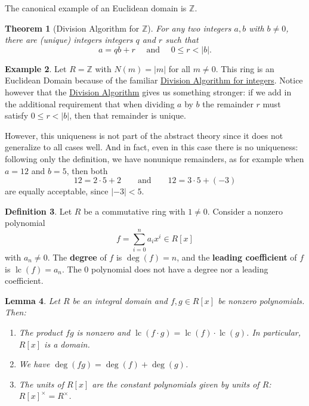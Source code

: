 \documentclass[12pt]{report}
\newtheorem{theorem}{Theorem}[chapter]
\newtheorem{lemma}[theorem]{Lemma}
\numberwithin{equation}{section}
\numberwithin{theorem}{chapter}
\theoremstyle{definition}
\newtheorem{definition}[theorem]{Definition}
\newtheorem{example}[theorem]{Example}
\newtheorem*{basic properties}{Basic Properties}
\newtheorem*{Important Remark}{Important Remark}
\newcommand{\df}[1]{{\bf #1}\index{#1}}
\DeclareMathOperator{\lc}{lc}
\begin{document}
The canonical example of an Euclidean domain is $\mathbb{Z}$.


\begin{theorem}[Division Algorithm for $\mathbb{Z}$]\label{division algorithm integers}
	For any two integers $a, b$ with $b \neq 0$, there are (unique) integers integers $q$ and $r$ such that 
$$a = qb + r \quad \text{ and } \quad 0 \leqslant r < |b|.$$
\end{theorem}


\begin{example}\label{Z is an euclidean domain}
Let $R = \mathbb{Z}$ with $N(m) = |m|$ for all $m \neq 0$. This ring is an Euclidean Domain because of the familiar \hyperref[division algorithm integers]{Division Algorithm for integers}. Notice however that the \hyperref[division algorithm integers]{Division Algorithm} gives us something stronger: if we add in the additional requirement that when dividing $a$ by $b$ the remainder $r$ must satisfy $0 \leqslant r < |b|$, then that remainder is unique. 

However, this uniqueness is not part of the abstract theory since it does not generalize to all cases well. And in fact, even in this case there is no uniqueness: following only the definition, we have nonunique remainders, as for example when $a = 12$ and $b = 5$, then both
$$12 = 2 \cdot 5 + 2 \qquad \text{and} \qquad 12 = 3 \cdot 5 + (-3)$$
are equally acceptable, since $|-3| < 5$. 
\end{example}



\begin{definition}
Let $R$ be a commutative ring with $1 \neq 0$. Consider a nonzero polynomial 
$$f = \sum_{i=0}^n a_i x^i\in R[x]$$ 
with $a_n \neq 0$.
The {\bf degree} of $f$ is $\deg(f) = n$, and the \df{leading coefficient} of $f$ is $\lc(f) = a_n$. The $0$ polynomial does not have a degree nor a leading coefficient.
\end{definition}



\begin{lemma}\label{degree of products of polynomials over domains}
Let $R$ be an integral domain and $f, g \in R[x]$ be nonzero polynomials. Then:
\begin{enumerate}[itemsep=-0.1em,leftmargin=20pt]
\vspace{-0.5em}
\item The product $fg$ is nonzero and $\lc(f \cdot g) = \lc(f) \cdot \lc(g)$.
In particular, $R[x]$ is a domain.
\item We have $\deg(f g)=\deg(f)+\deg(g)$.
\item The units of $R[x]$ are the constant polynomials given by units of $R$: $R[x]^\times=R^\times$.
\end{enumerate}
\end{lemma}
\end{document}
